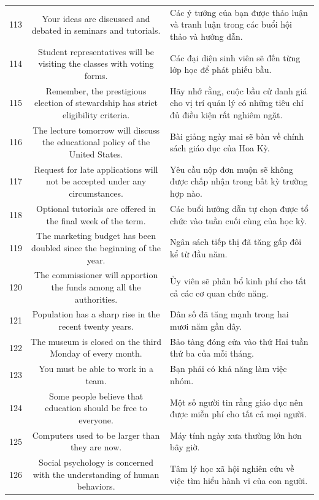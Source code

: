 \documentclass[11pt,a4paper]{article}
\begin{document}
\begin{longtable}{N S M}
113 & Your ideas are discussed and debated in seminars and tutorials. & Các ý tưởng của bạn được thảo luận và tranh luận trong các buổi hội thảo và hướng dẫn. \\
114 & Student representatives will be visiting the classes with voting forms. & Các đại diện sinh viên sẽ đến từng lớp học để phát phiếu bầu. \\
115 & Remember, the prestigious election of stewardship has strict eligibility criteria. & Hãy nhớ rằng, cuộc bầu cử danh giá cho vị trí quản lý có những tiêu chí đủ điều kiện rất nghiêm ngặt. \\
116 & The lecture tomorrow will discuss the educational policy of the United States. & Bài giảng ngày mai sẽ bàn về chính sách giáo dục của Hoa Kỳ. \\
117 & Request for late applications will not be accepted under any circumstances. & Yêu cầu nộp đơn muộn sẽ không được chấp nhận trong bất kỳ trường hợp nào. \\
118 & Optional tutorials are offered in the final week of the term. & Các buổi hướng dẫn tự chọn được tổ chức vào tuần cuối cùng của học kỳ. \\
119 & The marketing budget has been doubled since the beginning of the year. & Ngân sách tiếp thị đã tăng gấp đôi kể từ đầu năm. \\
120 & The commissioner will apportion the funds among all the authorities. & Ủy viên sẽ phân bổ kinh phí cho tất cả các cơ quan chức năng. \\
121 & Population has a sharp rise in the recent twenty years. & Dân số đã tăng mạnh trong hai mươi năm gần đây. \\
122 & The museum is closed on the third Monday of every month. & Bảo tàng đóng cửa vào thứ Hai tuần thứ ba của mỗi tháng. \\
123 & You must be able to work in a team. & Bạn phải có khả năng làm việc nhóm. \\
124 & Some people believe that education should be free to everyone. & Một số người tin rằng giáo dục nên được miễn phí cho tất cả mọi người. \\
125 & Computers used to be larger than they are now. & Máy tính ngày xưa thường lớn hơn bây giờ. \\
126 & Social psychology is concerned with the understanding of human behaviors. & Tâm lý học xã hội nghiên cứu về việc tìm hiểu hành vi của con người. \\

\end{longtable}
\end{document}

